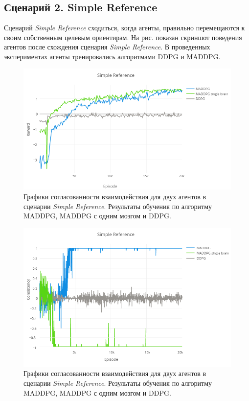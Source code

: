 \subsection{Сценарий 2. Simple Reference}

Сценарий \textit{Simple Reference} сходиться, когда агенты, правильно перемещаются к своим собственным целевым ориентирам. На рис.  показан скриншот поведения агентов после схождения сценария \textit{Simple Reference}. В проведенных экспериментах агенты тренировались алгоритмами DDPG и MADDPG.

\begin{figure}[ht!]
	\center
	\includegraphics [scale=0.6] {my_folder/images/ch5/sr-rew.png}
	\caption{Графики согласованности взаимодействия для двух агентов в сценарии \textit{Simple Reference}. Результаты обучения по алгоритму MADDPG, MADDPG с одним мозгом и DDPG.}
	\label{fig:result-sr-rew}
\end{figure}

\begin{figure}[ht!]
	\center
	\includegraphics [scale=0.6] {my_folder/images/ch5/sr-comm.png}
	\caption{Графики согласованности взаимодействия для двух агентов в сценарии \textit{Simple Reference}. Результаты обучения по алгоритму MADDPG, MADDPG с одним мозгом и DDPG.}
	\label{fig:result-sr-comm}
\end{figure}

